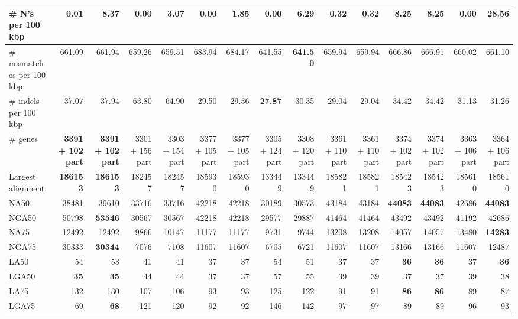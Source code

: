 \documentclass[12pt,a4paper]{article}
\begin{document}
\begin{table}[ht]
\begin{center}
\begin{tabular}{|l*{14}{|r}|}
\# N's per 100 kbp & 0.01 & 8.37 & {\bf 0.00} & 3.07 & {\bf 0.00} & 1.85 & {\bf 0.00} & 6.29 & 0.32 & 0.32 & 8.25 & 8.25 & {\bf 0.00} & 28.56 \\ \hline
\# mismatches per 100 kbp & 661.09 & 661.94 & 659.26 & 659.51 & 683.94 & 684.17 & 641.55 & {\bf 641.50} & 659.94 & 659.94 & 666.86 & 666.91 & 660.02 & 661.10 \\ \hline
\# indels per 100 kbp & 37.07 & 37.94 & 63.80 & 64.90 & 29.50 & 29.36 & {\bf 27.87} & 30.35 & 29.04 & 29.04 & 34.42 & 34.42 & 31.13 & 31.26 \\ \hline
\# genes & {\bf 3391 + 102 part} & {\bf 3391 + 102 part} & 3301 + 156 part & 3303 + 154 part & 3377 + 105 part & 3377 + 105 part & 3305 + 124 part & 3308 + 120 part & 3361 + 110 part & 3361 + 110 part & 3374 + 102 part & 3374 + 102 part & 3363 + 106 part & 3364 + 106 part \\ \hline
Largest alignment & {\bf 186153} & {\bf 186153} & 182457 & 182457 & 185930 & 185930 & 133449 & 133449 & 185821 & 185821 & 185423 & 185423 & 185610 & 185610 \\ \hline
NA50 & 38481 & 39610 & 33716 & 33716 & 42218 & 42218 & 30189 & 30573 & 43184 & 43184 & {\bf 44083} & {\bf 44083} & 42686 & {\bf 44083} \\ \hline
NGA50 & 50798 & {\bf 53546} & 30567 & 30567 & 42218 & 42218 & 29577 & 29887 & 41464 & 41464 & 43492 & 43492 & 41192 & 42686 \\ \hline
NA75 & 12492 & 12492 & 9866 & 10147 & 11177 & 11177 & 9731 & 9744 & 13208 & 13208 & 14057 & 14057 & 13480 & {\bf 14283} \\ \hline
NGA75 & 30333 & {\bf 30344} & 7076 & 7108 & 11607 & 11607 & 6705 & 6721 & 11607 & 11607 & 13166 & 13166 & 11607 & 12487 \\ \hline
LA50 & 54 & 53 & 41 & 41 & 37 & 37 & 54 & 51 & 37 & 37 & {\bf 36} & {\bf 36} & 37 & {\bf 36} \\ \hline
LGA50 & {\bf 35} & {\bf 35} & 44 & 44 & 37 & 37 & 57 & 55 & 39 & 39 & 37 & 37 & 39 & 38 \\ \hline
LA75 & 132 & 130 & 107 & 106 & 93 & 93 & 125 & 122 & 91 & 91 & {\bf 86} & {\bf 86} & 89 & 87 \\ \hline
LGA75 & 69 & {\bf 68} & 121 & 120 & 92 & 92 & 146 & 142 & 97 & 97 & 89 & 89 & 96 & 93 \\ \hline
\end{tabular}
\end{center}
\end{table}
\end{document}
